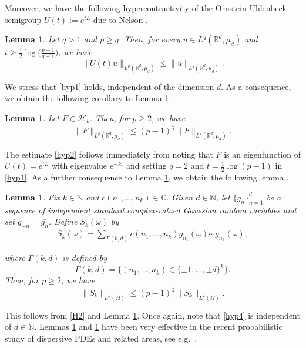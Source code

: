 \documentclass[letterpaper, 11pt,  reqno]{amsart}
\newtheorem{lemma}[theorem]{Lemma}
\newcommand{\1}{\hspace{0.5mm}\text{I}\hspace{0.5mm}}
\newcommand{\noi}{\noindent}
\newcommand{\R}{\mathbb{R}}
\newcommand{\C}{\mathbb{C}}
\newcommand{\G}{\Gamma}
\newcommand{\cj}{\overline}
\renewcommand{\o}{\omega}
\renewcommand{\O}{\Omega}
\newcommand{\N}{\mathbb{N}}
\numberwithin{equation}{section}
\numberwithin{theorem}{section}
\begin{document}
\noi
Moreover, we have the following  hypercontractivity of the Ornstein-Uhlenbeck
semigroup $U(t) := e^{tL}$ due to Nelson \cite{Nelson2}.

\begin{lemma} \label{LEM:hyp1}
Let $q > 1$
and $p \geq q$.
Then, 
for every $u \in L^q (\R^d, \mu_d)$
and  $t \geq
\frac{1}{2}\log\big(\frac{p-1}{q-1}\big)$, we have
\begin{equation}\label{hyp1}
\|U(t) u \|_{L^p(\R^d, \mu_d)}\leq \|u\|_{L^q(\R^d, \mu_d)}.
\end{equation}
\end{lemma}
We stress that 
 \eqref{hyp1} holds, independent of the dimension $d$.
As a consequence, we obtain the following corollary to Lemma \ref{LEM:hyp1}.
\begin{lemma} \label{LEM:hyp2}
Let $F \in \mathcal{H}_k$.
Then, for $p \geq 2$, we have
\begin{equation} \label{hyp2}
\| F \|_{L^p(\R^d, \mu_d)}\leq (p-1)^\frac{k}{2}
\|F\|_{L^2(\R^d, \mu_d)}.
\end{equation}
\end{lemma}
The estimate \eqref{hyp2} follows immediately
from noting that 
 $F$ is an eigenfunction
of $U(t) = e^{tL}$ with eigenvalue $e^{-kt}$
and setting  $q = 2$ and $t =\frac{1}{2} \log (p - 1)$ in  \eqref{hyp1}.
As a further consequence to Lemma \ref{LEM:hyp2}, we obtain the following lemma
\cite[Theorem I.22]{Simon}.
%
\begin{lemma}\label{LEM:hyp3}
Fix $k \in \mathbb{N}$ and $c(n_1, \dots, n_k) \in \C$.
Given 	
 $d \in \mathbb{N}$, 
 let $\{ g_n\}_{n = 1}^d$ be 
 a sequence of  independent standard complex-valued Gaussian random variables
 and set $g_{-n} = \cj{g_n}$.
Define $S_k(\o)$ by 
\begin{align*}
 S_k(\o) = \sum_{\G(k, d)} c(n_1, \dots, n_k) g_{n_1} (\o)\cdots g_{n_k}(\o),
 \end{align*}

\noi
where $\G(k, d)$ is defined by
\[ \G(k, d) = \big\{ (n_1, \dots, n_k) \in \{ \pm1, \dots,\pm d\}^k \big\}.\]
Then, for $p \geq 2$, we have
\begin{equation}
 \|S_k \|_{L^p(\O)} \leq (p-1)^\frac{k}{2}\|S_k\|_{L^2(\O)}.
\label{hyp4}
 \end{equation}
\end{lemma}


This  follows from \eqref{H2}
and Lemma \ref{LEM:hyp2}.
Once again, note that \eqref{hyp4} is independent of $d \in \N$.
Lemmas \ref{LEM:hyp2} and \ref{LEM:hyp3}
have been very effective
in the recent probabilistic study of dispersive PDEs
and related areas, see e.g.~\cite{Tzv, TTz, Benyi, CO,  BTT1}.
\end{document}
